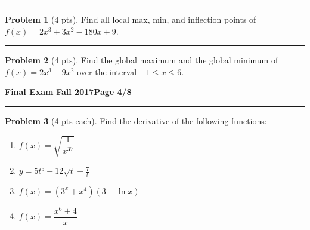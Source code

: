 \documentclass[12pt]{article}
\theoremstyle{definition}
\newtheorem{problem}{Problem}
\begin{document}
\hrule
\begin{problem}[4 pts]
Find all local max, min, and inflection points of $f(x) = 2x^3 + 3x^2-180x+9$.
\end{problem}
\vspace{6cm}
\hrule
\begin{problem}[4 pts]
Find the global maximum and the global minimum of $f(x) = 2x^3 - 9x^2$ over the interval $-1 \leq x \leq 6$.
\end{problem}

\newpage

\hfill{\large\bf Final Exam}\hfill{\large\bf
  Fall 2017}\hfill{\large\bf Page 4/8}\hrule

\bigskip

\bigskip
\begin{problem}[4 pts each]
Find the derivative of the following functions:
\begin{enumerate}
\item $f(x) = \sqrt{\dfrac{1}{x^{37}}}$
\begin{flushright}
\end{flushright}
\item $y = 5t^5 - 12\sqrt{t} + \frac{7}{t}$
\begin{flushright}
\end{flushright}
\item $f(x) = (3^x + x^4)(3 - \ln x)$
\begin{flushright}
\end{flushright}
\item $f(x) = \dfrac{x^6+4}{x}$
\begin{flushright}
\end{flushright}

\end{enumerate}
\end{problem}
\end{document}
